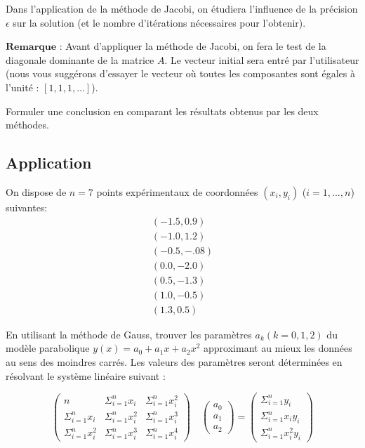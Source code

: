 \documentclass{article}
\begin{document}
Dans l'application de la méthode de Jacobi, on étudiera l'influence de
la précision \(\epsilon\) sur la solution (et le nombre d'itérations
nécessaires pour l'obtenir).

\(\textbf{Remarque}\) : Avant d'appliquer la méthode de Jacobi, on fera
le test de la diagonale dominante de la matrice \(A\). Le vecteur
initial sera entré par l'utilisateur (nous vous suggérons d'essayer le
vecteur où toutes les composantes sont égales à l'unité :
\([1,1,1,\ldots]\)).

Formuler une conclusion en comparant les résultats obtenus par les deux
méthodes.


    \subsection{Application}


    On dispose de \(n = 7\) points expérimentaux de coordonnées
\((x_i,y_i)\) (\(i=1,...,n\)) suivantes: \[
\begin{array}{l}
(-1.5, 0.9)\\
(-1.0, 1.2)\\ 
(-0.5, -.08)\\ 
(0.0, -2.0)\\ 
(0.5, -1.3)\\
(1.0, -0.5)\\
(1.3, 0.5)
\end{array} 
\]

En utilisant la méthode de Gauss, trouver les paramètres
\(a_k (k = 0,1,2)\) du modèle parabolique
\(y(x) = a_0 + a_1 x + a_2 x^2\) approximant au mieux les données au
sens des moindres carrés. Les valeurs des paramètres seront déterminées
en résolvant le système linéaire suivant :

\[
\left( \begin{array}{ccc}
n & \Sigma_{i=1}^{n} x_i & \Sigma_{i=1}^{n} x_i^2\\
\Sigma_{i=1}^{n} x_i & \Sigma_{i=1}^{n} x_i^2 & \Sigma_{i=1}^{n} x_i^3 \\
\Sigma_{i=1}^{n} x_i^2 & \Sigma_{i=1}^{n} x_i^3 & \Sigma_{i=1}^{n} x_i^4 
\end{array} \right)
\quad 
\left( \begin{array}{c}
a_0 \\
a_1 \\
a_2
\end{array} \right)
= 
\left( \begin{array}{c}
\Sigma_{i=1}^{n} y_i \\
\Sigma_{i=1}^{n} x_i y_i \\
\Sigma_{i=1}^{n} x_i^2 y_i 
\end{array} \right)
\]
\end{document}
